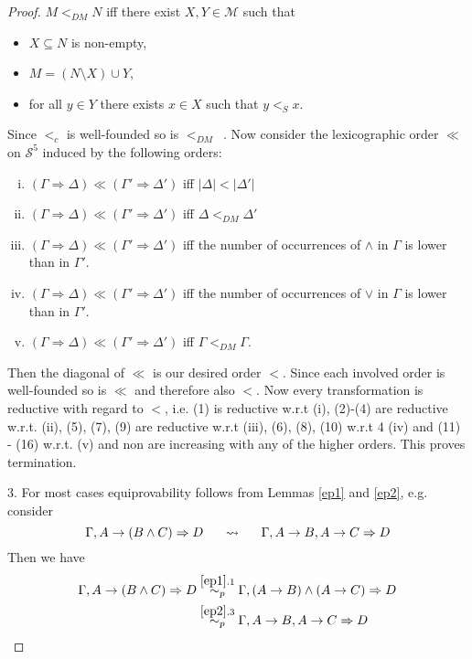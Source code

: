 \documentclass[a4paper,12pt]{article}
\theoremstyle{definition}
\theoremstyle{definition}
\theoremstyle{definition}
\theoremstyle{definition}
\theoremstyle{definition}
\theoremstyle{definition}
\begin{document}
\begin{proof}[Proof]
		$M <_{DM}N$ iff there exist $X, Y\in\mathcal{M}$ such that
		\begin{itemize}
			\item $X\subseteq N$ is non-empty,
			\item $M = (N \setminus X) \cup Y$,
			\item for all $y\in Y$ there exists $x\in X$ such that $y <_S x$.
		\end{itemize}
		Since $<_c$ is well-founded so is $<_{DM}$~\cite{Dershowitz-Manna_1979}. Now consider the lexicographic order $\ll$ on $\mathcal{S}^5$ induced by the following orders:
		\begin{enumerate}[(i)]
			\item $(\Gamma\Rightarrow\Delta)\ll(\Gamma'\Rightarrow\Delta')$ iff $|\Delta| < |\Delta'|$ 
			\item $(\Gamma\Rightarrow\Delta)\ll(\Gamma'\Rightarrow\Delta')$ iff $\Delta <_{DM} \Delta'$
			\item $(\Gamma\Rightarrow\Delta)\ll(\Gamma'\Rightarrow\Delta')$ iff the number of occurrences of $\wedge$ in $\Gamma$ is lower than in $\Gamma' $.
			\item $(\Gamma\Rightarrow\Delta)\ll(\Gamma'\Rightarrow\Delta')$ iff the number of occurrences of $\vee$ in $\Gamma$ is lower than in $\Gamma' $.
			\item $(\Gamma\Rightarrow\Delta)\ll(\Gamma'\Rightarrow\Delta')$ iff $\Gamma <_{DM}\Gamma $.
		\end{enumerate}
		Then the diagonal of $\ll$ is our desired order $<$. Since each involved order is well-founded so is $\ll$ and therefore also $<$. Now every transformation is reductive with regard to $<$, i.e. (1) is reductive w.r.t (i), (2)-(4) are reductive w.r.t. (ii), (5), (7), (9) are reductive w.r.t (iii), (6), (8), (10) w.r.t 4 (iv) and (11) - (16) w.r.t. (v) and non are increasing with any of the higher orders. This proves termination.
		 
		3. For most cases equiprovability follows from Lemmas \ref{ep1} and \ref{ep2}, e.g. consider $$\Gamma, A\to (B\wedge C)\Rightarrow D\indent\rightsquigarrow\indent\Gamma, A\to B, A\to C\Rightarrow D$$Then we have
		\begin{align*}
			\Gamma, A\to (B\wedge C)\Rightarrow D&\overset{\ref{ep1}.1}{\sim_p}\Gamma, (A\to B)\wedge (A\to C)\Rightarrow D\\&\overset{\ref{ep2}.3}{\sim_p}\Gamma, A\to B, A\to C\Rightarrow D
		\end{align*}
		

\end{proof}
\end{document}
